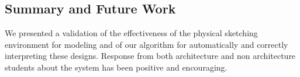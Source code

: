 



\subsection{Summary and Future Work}

We presented a validation of the effectiveness of the
physical sketching environment for modeling and of our algorithm for
automatically and correctly interpreting these designs.  Response from
both architecture and non architecture students about the system has
been positive and encouraging.

